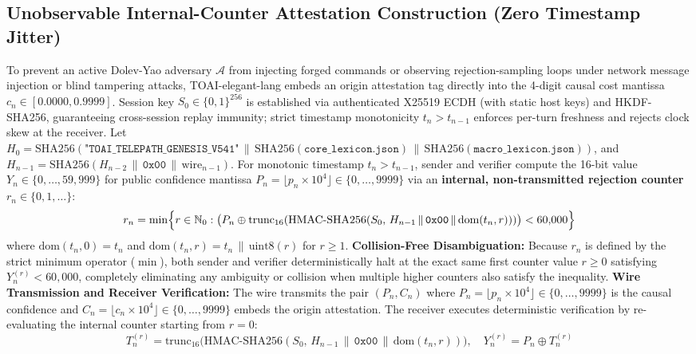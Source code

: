 \documentclass[9pt,a4paper]{extarticle}
\begin{document}
\subsection{Unobservable Internal-Counter Attestation Construction (Zero Timestamp Jitter)}
To prevent an active Dolev-Yao adversary $\mathcal{A}$ from injecting forged commands or observing rejection-sampling loops under network message injection or blind tampering attacks, TOAI-elegant-lang embeds an origin attestation tag directly into the 4-digit causal cost mantissa $c_n \in [0.0000, 0.9999]$. Session key $S_0 \in \{0,1\}^{256}$ is established via authenticated X25519 ECDH (with static host keys) and HKDF-SHA256, guaranteeing cross-session replay immunity; strict timestamp monotonicity $t_n > t_{n-1}$ enforces per-turn freshness and rejects clock skew at the receiver. Let $H_0 = \text{SHA256}(\texttt{"TOAI\_TELEPATH\_GENESIS\_V541"} \,\|\,\allowbreak \text{SHA256}(\texttt{core\_lexicon.json}) \,\|\,\allowbreak \text{SHA256}(\texttt{macro\_lexicon.json}))$, and $H_{n-1} = \text{SHA256}(H_{n-2} \,\|\, \texttt{0x00} \,\|\, \text{wire}_{n-1})$. For monotonic timestamp $t_n > t_{n-1}$, sender and verifier compute the 16-bit value $Y_n \in \{0, \dots, 59{,}999\}$ for public confidence mantissa $P_n = \lfloor p_n \times 10^4 \rfloor \in \{0, \dots, 9999\}$ via an \textbf{internal, non-transmitted rejection counter} $r_n \in \{0, 1, \dots\}$:
\begin{equation}
  r_n = \min\Bigl\{ r \in \mathbb{N}_0 : \bigl(P_n \oplus \text{trunc}_{16}(\text{HMAC-SHA256}(S_0,\, H_{n-1} \,\|\, \texttt{0x00} \,\|\, \text{dom}(t_n, r)))\bigr) < 60{,}000 \Bigr\}
  \label{eq:internal_counter}
\end{equation}
where $\text{dom}(t_n, 0) = t_n$ and $\text{dom}(t_n, r) = t_n \,\|\, \text{uint8}(r)$ for $r \ge 1$. \textbf{Collision-Free Disambiguation:} Because $r_n$ is defined by the strict minimum operator ($\min$), both sender and verifier deterministically halt at the exact same first counter value $r \ge 0$ satisfying $Y_n^{(r)} < 60{,}000$, completely eliminating any ambiguity or collision when multiple higher counters also satisfy the inequality.
\textbf{Wire Transmission and Receiver Verification:} The wire transmits the pair $(P_n, C_n)$ where $P_n = \lfloor p_n \times 10^4 \rfloor \in \{0, \dots, 9999\}$ is the causal confidence and $C_n = \lfloor c_n \times 10^4 \rfloor \in \{0, \dots, 9999\}$ embeds the origin attestation. The receiver executes deterministic verification by re-evaluating the internal counter starting from $r=0$:
\begin{equation}
  T_n^{(r)} = \text{trunc}_{16}\bigl(\text{HMAC-SHA256}(S_0,\, H_{n-1} \,\|\, \texttt{0x00} \,\|\, \text{dom}(t_n, r))\bigr), \quad Y_n^{(r)} = P_n \oplus T_n^{(r)}
  \label{eq:mac_verify}
\end{equation}
\end{document}
